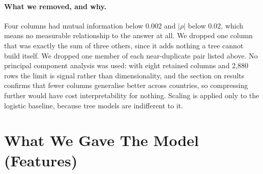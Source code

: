 \documentclass[10pt]{article}
\begin{document}
\begin{table}[htbp]
\centering
\caption{Top 8 features by importance to the trained model, with marginal statistics
alongside. The gap between the two sets of numbers is the disagreement described above.}
\small
{}
\end{table}

\paragraph{What we removed, and why.} Four columns had mutual information below 0.002 and
$|\rho|$ below 0.02, which means no measurable relationship to the answer at all. We
dropped one column that was exactly the sum of three others, since it adds nothing a tree
cannot build itself. We dropped one member of each near-duplicate pair listed above. No
principal component analysis was used: with eight retained columns and 2,880 rows the limit is signal
rather than dimensionality, and the section on results confirms that fewer columns
generalise better across countries, so compressing further would have cost
interpretability for nothing. Scaling is applied only to the logistic baseline, because
tree models are indifferent to it.

\section{What We Gave The Model (Features)}
\label{sec:features}
\end{document}
